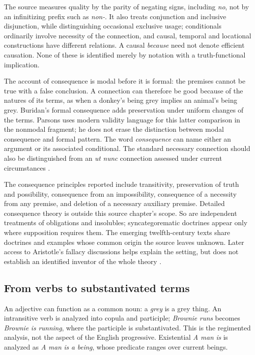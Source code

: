 The source measures quality by the parity of negating signs, including
\emph{no}, not by an infinitizing prefix such as \emph{non-}. It also treats
conjunction and inclusive disjunction, while distinguishing occasional
exclusive usage; conditionals ordinarily involve necessity of the
connection, and causal, temporal and locational constructions have
different relations. A causal \emph{because} need not denote efficient
causation. None of these is identified merely by notation with a
truth-functional implication.


The account of consequence is modal before it is formal: the premises
cannot be true with a false conclusion. A connection can therefore be
good because of the natures of its terms, as when a donkey's being grey
implies an animal's being grey. Buridan's formal consequence adds
preservation under uniform changes of the terms. Parsons uses modern
validity language for this latter comparison in the nonmodal fragment;
he does not erase the distinction between modal consequence and formal
pattern. The word \emph{consequence} can name either an argument or
its associated conditional. The standard necessary connection should
also be distinguished from an \emph{ut nunc} connection assessed under
current circumstances
\cite[pp.~171--173]{Parsons2007FordhamSupposition}.

The consequence principles reported include transitivity, preservation
of truth and possibility, consequence from an impossibility, consequence
of a necessity from any premise, and deletion of a necessary auxiliary
premise. Detailed consequence theory is outside this source chapter's
scope. So are independent treatments of obligations and insolubles;
syncategorematic doctrines appear only where supposition requires them.
The emerging twelfth-century texts share doctrines and examples whose
common origin the source leaves unknown. Later access to Aristotle's
fallacy discussions helps explain the setting, but does not establish
an identified inventor of the whole theory
\cite[pp.~157--158,172--173]{Parsons2007FordhamSupposition}.

\subsection{From verbs to substantivated terms}
\label{sec:p13-supposition-parasitic}

An adjective can function as a common noun: a \emph{grey} is a grey
thing. An intransitive verb is analyzed into copula and participle;
\emph{Brownie runs} becomes \emph{Brownie is running}, where the participle
is substantivated. This is the regimented analysis, not the aspect
of the English progressive. Existential \emph{A man is} is analyzed
as \emph{A man is a being}, whose predicate ranges over current beings.

